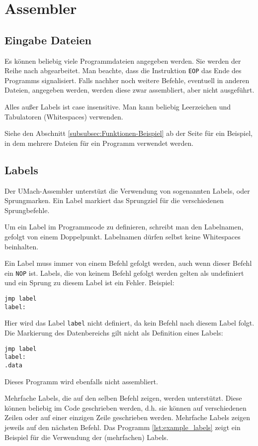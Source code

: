 \section{Assembler}

\subsection{Eingabe Dateien}

Es können beliebig viele Programmdateien angegeben werden. Sie werden der
Reihe nach abgearbeitet. Man beachte, dass die Instruktion \texttt{EOP} das
Ende des Programms signalisiert. Falls nachher noch weitere Befehle, eventuell
in anderen Dateien, angegeben werden, werden diese zwar assembliert, aber nicht
ausgeführt.

Alles außer Labels ist case insensitive. Man kann beliebig Leerzeichen und
Tabulatoren (Whitespaces) verwenden.


Siehe den Abschnitt \ref{subsubsec:Funktionen-Beispiel} ab der Seite
\pageref{subsubsec:Funktionen-Beispiel} für ein Beispiel, in dem mehrere Dateien
für ein Programm verwendet werden.

\subsection{Labels}

Der UMach-Assembler unterstüzt die Verwendung von sogenannten \glqq Labels\grqq,
oder Sprungmarken. Ein Label markiert das Sprungziel für die verschiedenen
Sprungbefehle.

Um ein Label im Programmcode zu definieren, schreibt man den
Labelnamen, gefolgt von einem Doppelpunkt. Labelnamen dürfen selbst keine
Whitespaces beinhalten.

Ein Label muss immer von einem Befehl gefolgt werden, auch wenn dieser Befehl
ein \texttt{NOP} ist. Labels, die von keinem Befehl gefolgt werden gelten als
undefiniert und ein Sprung zu diesem Label ist ein Fehler. Beispiel:
\begin{lstlisting}
jmp label
label:
\end{lstlisting}
Hier wird das Label \texttt{label} nicht definiert, da kein Befehl nach diesem
Label folgt. Die Markierung des Datenbereichs gilt nicht als Definition eines
Labels:
\begin{lstlisting}
jmp label
label:
.data
\end{lstlisting}
Dieses Programm wird ebenfalls nicht assembliert.

Mehrfache Labels, die auf den selben Befehl zeigen, werden unterstützt. Diese
können beliebig im Code geschrieben werden, d.h. sie können auf verschiedenen
Zeilen oder auf einer einzigen Zeile geschrieben werden. Mehrfache Labels
zeigen jeweils auf den nächsten Befehl. Das Programm \ref{lst:example_labels}
zeigt ein Beispiel für die Verwendung der (mehrfachen) Labels.

